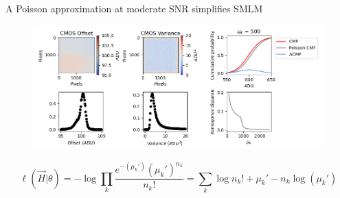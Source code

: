 \documentclass{beamer}					%
\begin{document}
\begin{frame}{A Poisson approximation at moderate SNR simplifies SMLM}

\begin{figure}
\includegraphics[width=13cm]{Noise.png}
\end{figure}

\begin{equation*}
\ell(\vec{H}|\theta) = -\log \prod_{k} \frac{e^{-\left(\mu_{k}'\right)}\left(\mu_{k}'\right)^{n_{k}}}{n_{k}!} = \sum_{k}  \log n_{k}! + \mu_{k}' - n_{k}\log\left(\mu_{k}'\right)
\end{equation*}

\end{frame}
\end{document}
